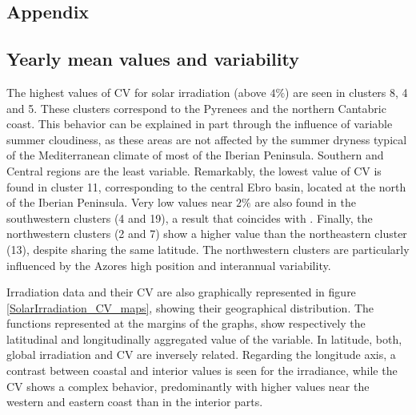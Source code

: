 \begin{subappendices}

\section{Appendix}

\subsection{Yearly mean values and variability}

The highest values of CV for solar irradiation (above $4\%$) are seen in clusters 8, 4 and 5. These clusters correspond to the Pyrenees and the northern Cantabric coast. This behavior can be explained in part through the influence of variable summer cloudiness, as these areas are not affected by the summer dryness typical of the Mediterranean climate of most of the Iberian Peninsula. Southern and Central regions are the least variable. Remarkably, the lowest value of CV is found in cluster 11, corresponding to the central Ebro basin, located at the north of the Iberian Peninsula. Very low values near $2\%$   are also found in the southwestern clusters (4 and 19), a result that coincides with \cite{Gil2015}. Finally, the northwestern clusters (2 and 7) show a higher value than the northeastern cluster (13), despite sharing the same latitude. The northwestern clusters are particularly influenced by the Azores high position and interannual variability.

Irradiation data and their CV are also graphically represented in figure \ref{SolarIrradiation_CV_maps}, showing their geographical distribution. The functions represented at the margins of the graphs, show respectively the latitudinal and longitudinally aggregated value of the variable. In latitude, both, global irradiation and CV are inversely related. Regarding the longitude axis, a contrast between coastal and interior values is seen for the irradiance, while the CV shows a complex behavior, predominantly with higher values near the western and eastern coast than in the interior parts.


\end{subappendices}
